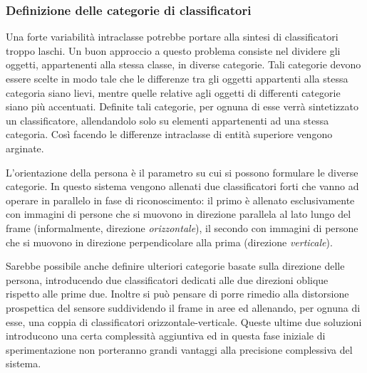             \subsubsection{Definizione delle categorie di classificatori}
                Una forte variabilità intraclasse potrebbe portare alla sintesi di classificatori troppo laschi.
                Un buon approccio a questo problema consiste nel dividere gli oggetti, appartenenti alla stessa classe, in diverse categorie.
                Tali categorie devono essere scelte in modo tale che le differenze tra gli oggetti appartenti alla stessa categoria siano lievi, mentre quelle relative agli oggetti di differenti categorie siano più accentuati.
                Definite tali categorie, per ognuna di esse verrà sintetizzato un classificatore, allendandolo solo su elementi appartenenti ad una stessa categoria.
                Così facendo le differenze intraclasse di entità superiore vengono arginate.

                L'orientazione della persona è il parametro su cui si possono formulare le diverse categorie.
                In questo sistema vengono allenati due classificatori forti che vanno ad operare in parallelo in fase di riconoscimento: il primo è allenato esclusivamente con immagini di persone che si muovono in direzione parallela al lato lungo del frame (informalmente, direzione \emph{orizzontale}), il secondo con immagini di persone che si muovono in direzione perpendicolare alla prima (direzione \emph{verticale}).

                Sarebbe possibile anche definire ulteriori categorie basate sulla direzione delle persona, introducendo due classificatori dedicati alle due direzioni oblique rispetto alle prime due.
                Inoltre si può pensare di porre rimedio alla distorsione prospettica del sensore suddividendo il frame in aree ed allenando, per ognuna di esse, una coppia di classificatori orizzontale-verticale.
                Queste ultime due soluzioni introducono una certa complessità aggiuntiva ed in questa fase iniziale di sperimentazione non porteranno grandi vantaggi alla precisione complessiva del sistema.

